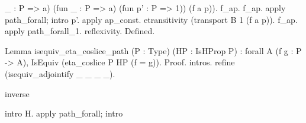 \begin{coqdoccode}
\begin{coqdoccomment}
\_\coqdocindent{0.50em}
:\coqdocindent{0.50em}
P\coqdocindent{0.50em}
=>\coqdocindent{0.50em}
a)\coqdocindent{0.50em}
(fun\coqdocindent{0.50em}
\_\coqdocindent{0.50em}
:\coqdocindent{0.50em}
P\coqdocindent{0.50em}
=>\coqdocindent{0.50em}
a)\coqdoceol
\coqdocindent{4.00em}
(fun\coqdocindent{0.50em}
p'\coqdocindent{0.50em}
:\coqdocindent{0.50em}
P\coqdocindent{0.50em}
=>\coqdocindent{0.50em}
1))\coqdocindent{0.50em}
\coqdoceol
\coqdocindent{2.50em}
(f\coqdocindent{0.50em}
a\coqdocindent{0.50em}
p)).\coqdoceol
\coqdocindent{1.00em}
f\_ap.\coqdocindent{0.50em}
f\_ap.\coqdocindent{0.50em}
apply\coqdocindent{0.50em}
path\_forall;\coqdocindent{0.50em}
intro\coqdocindent{0.50em}
p'.\coqdoceol
\coqdocindent{1.00em}
apply\coqdocindent{0.50em}
ap\_const.\coqdoceol
\coqdocindent{1.00em}
etransitivity\coqdocindent{0.50em}
(transport\coqdocindent{0.50em}
B\coqdocindent{0.50em}
1\coqdocindent{0.50em}
(f\coqdocindent{0.50em}
a\coqdocindent{0.50em}
p)).\coqdoceol
\coqdocindent{1.00em}
f\_ap.\coqdocindent{0.50em}
apply\coqdocindent{0.50em}
path\_forall\_1.\coqdoceol
\coqdocindent{1.00em}
reflexivity.\coqdoceol
Defined.\coqdoceol
\end{coqdoccomment}
\coqdoceol
\coqdocemptyline
\coqdocnoindent
\begin{coqdoccomment}
\coqdoceol
Lemma\coqdocindent{0.50em}
isequiv\_eta\_coslice\_path\coqdocindent{0.50em}
(P\coqdocindent{0.50em}
:\coqdocindent{0.50em}
Type)\coqdocindent{0.50em}
(HP\coqdocindent{0.50em}
:\coqdocindent{0.50em}
IsHProp\coqdocindent{0.50em}
P)\coqdoceol
\coqdocindent{1.00em}
:\coqdocindent{0.50em}
forall\coqdocindent{0.50em}
A\coqdocindent{0.50em}
(f\coqdocindent{0.50em}
g\coqdocindent{0.50em}
:\coqdocindent{0.50em}
P\coqdocindent{0.50em}
->\coqdocindent{0.50em}
A),\coqdoceol
\coqdocindent{3.00em}
IsEquiv\coqdocindent{0.50em}
(eta\_coslice\coqdocindent{0.50em}
P\coqdocindent{0.50em}
HP\coqdocindent{0.50em}
(f\coqdocindent{0.50em}
=\coqdocindent{0.50em}
g)).\coqdoceol
Proof.\coqdoceol
\coqdocindent{1.00em}
intros.\coqdoceol
\coqdocindent{1.00em}
refine\coqdocindent{0.50em}
(isequiv\_adjointify\coqdocindent{0.50em}
\_\coqdocindent{0.50em}
\_\coqdocindent{0.50em}
\_\coqdocindent{0.50em}
\_).\coqdoceol
\coqdoceol
\coqdocindent{1.00em}
\begin{coqdoccomment}
\coqdocindent{0.50em}
inverse\coqdocindent{0.50em}
\end{coqdoccomment}
\coqdoceol
\coqdocindent{1.00em}
intro\coqdocindent{0.50em}
H.\coqdocindent{0.50em}
\coqdoceol
\coqdocindent{1.00em}
apply\coqdocindent{0.50em}
path\_forall;\coqdocindent{0.50em}
intro\coqdocindent{0.50em}

\end{coqdoccomment}
\end{coqdoccode}
